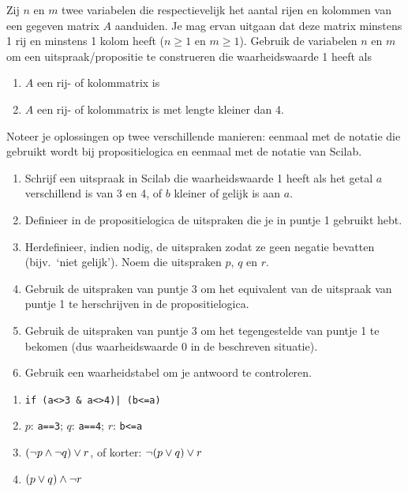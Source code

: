 \begin{oef}
Zij $n$ en $m$ twee variabelen die respectievelijk het aantal rijen en kolommen van een gegeven matrix $A$ aanduiden.
Je mag ervan uitgaan dat deze matrix minstens 1 rij en minstens 1 kolom heeft ($n \geqslant 1$ en $m\geqslant 1$).
Gebruik de variabelen $n$ en $m$ om een uitspraak/propositie te construeren die waarheidswaarde 1 heeft als

\begin{enumerate}
  \item $A$ een rij- of kolommatrix is
  \item $A$ een rij- of kolommatrix is met lengte kleiner dan 4.
\end{enumerate}
Noteer je oplossingen op twee verschillende manieren: eenmaal met de notatie die gebruikt wordt bij propositielogica en eenmaal met de notatie van Scilab.
\end{oef}

\begin{oef}
\begin{enumerate}
  \item Schrijf een uitspraak in Scilab die waarheidswaarde 1 heeft als het getal $a$ verschillend is van 3 en 4, of $b$ kleiner of gelijk is aan $a$.
  \item Definieer in de propositielogica de uitspraken die je in puntje 1 gebruikt hebt.
  \item Herdefinieer, indien nodig, de uitspraken zodat ze geen negatie bevatten (bijv.\ `niet gelijk'). Noem die uitspraken $p$, $q$ en $r$.
  \item Gebruik de uitspraken van puntje 3 om het equivalent van de uitspraak van 
        puntje 1 te herschrijven in de propositielogica.
  \item Gebruik de uitspraken van puntje 3 om het tegengestelde van puntje 1 te 
        bekomen (dus waarheidswaarde 0 in de beschreven situatie).
  \item Gebruik een waarheidstabel om je antwoord te controleren.
\end{enumerate}
\begin{opl}
\begin{enumerate}
  \item \verb+if (a<>3 & a<>4)| (b<=a)+
  \item $p$: \texttt{a==3}; $q$: \texttt{a==4}; $r$: \texttt{b<=a}
  \item $(\neg p \wedge \neg q)\vee r$, of korter: $\neg(p \vee q) \vee r$
  \item $(p\vee q)\wedge \neg r$
\end{enumerate}
\end{opl}
\end{oef}


